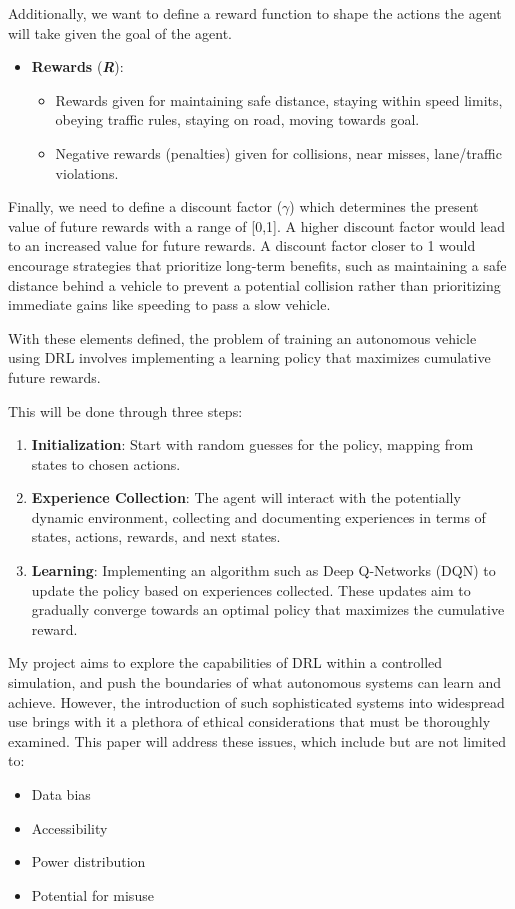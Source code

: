 \documentclass[10pt,twocolumn]{article}
\begin{document}
Additionally, we want to define a reward function to shape the actions the agent will take given the goal of the agent. 

\begin{itemize}
    \item \textbf{Rewards }(\textbf{\textit{R}}):
    \begin{itemize}
        \item Rewards given for maintaining safe distance, staying within speed limits, obeying traffic rules, staying on road, moving towards goal.
        \item Negative rewards (penalties) given for collisions, near misses, lane/traffic violations.
    \end{itemize}
\end{itemize}

Finally, we need to define a discount factor ($\gamma$) which determines the present value of future rewards with a range of [0,1]. A higher discount factor would lead to an increased value for future rewards. A discount factor closer to 1 would encourage strategies that prioritize long-term benefits, such as maintaining a safe distance behind a vehicle to prevent a potential collision rather than prioritizing immediate gains like speeding to pass a slow vehicle.

With these elements defined, the problem of training an autonomous vehicle using DRL involves implementing a learning policy that maximizes cumulative future rewards.

This will be done through three steps:
\begin{enumerate}
    \item \textbf{Initialization}: Start with random guesses for the policy, mapping from states to chosen actions.
    \item \textbf{Experience Collection}: The agent will interact with the potentially dynamic environment, collecting and documenting experiences in terms of states, actions, rewards, and next states.
    \item \textbf{Learning}: Implementing an algorithm such as Deep Q-Networks (DQN) to update the policy based on experiences collected. These updates aim to gradually converge towards an optimal policy that maximizes the cumulative reward.
\end{enumerate}

My project aims to explore the capabilities of DRL within a controlled simulation, and push the boundaries of what autonomous systems can learn and achieve. However, the introduction of such sophisticated systems into widespread use brings with it a plethora of ethical considerations that must be thoroughly examined. This paper will address these issues, which include but are not limited to:
\begin{itemize}
    \item Data bias
    \item Accessibility
    \item Power distribution
    \item Potential for misuse
\end{itemize}
\end{document}
